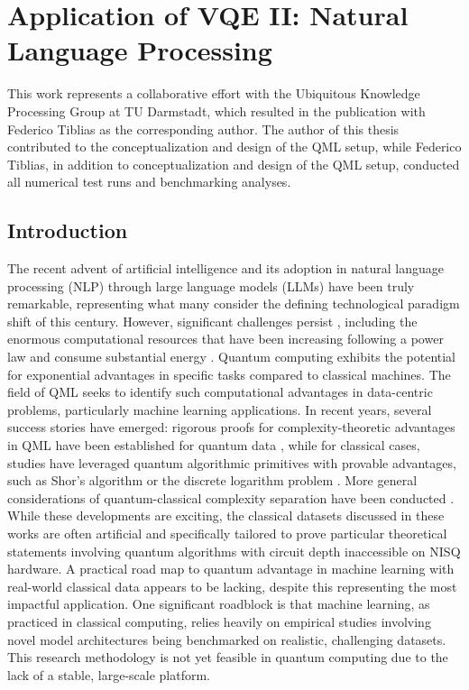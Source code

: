 \documentclass[../main.tex]{subfiles}
\begin{document}
\chapter{Application of VQE II: Natural Language Processing}\label{chap:qnlp}

This work represents a collaborative effort with the Ubiquitous Knowledge Processing Group at TU Darmstadt, which resulted in the publication \cite{tiblias2025an} with Federico Tiblias as the corresponding author. The author of this thesis contributed to the conceptualization and design of the QML setup, while Federico Tiblias, in addition to conceptualization and design of the QML setup, conducted all numerical test runs and benchmarking analyses.

\section{Introduction}

The recent advent of artificial intelligence \cite{krizhevsky2012imagenet} and its adoption in natural language processing (NLP) through large language models (LLMs) \cite{vaswani2017attention,brown2020language} have been truly remarkable, representing what many consider the defining technological paradigm shift of this century. However, significant challenges persist \cite{kaddour2023challenges}, including the enormous computational resources that have been increasing following a power law \cite{kaplan2020scaling} and consume substantial energy \cite{schwartz2019green}. Quantum computing exhibits the potential for exponential advantages in specific tasks compared to classical machines. The field of \ac{QML} \cite{biamonte2017quantum} seeks to identify such computational advantages in data-centric problems, particularly machine learning applications.
In recent years, several success stories have emerged: rigorous proofs for complexity-theoretic advantages in QML have been established for quantum data \cite{huang2021information, huang2022quantum}, while for classical cases, studies have leveraged quantum algorithmic primitives with provable advantages, such as Shor's algorithm or the discrete logarithm problem \cite{sweke2021on, pirnay2023superpolynomial, servedio2012equivalences, liu2021a}. More general considerations of quantum-classical complexity separation have been conducted \cite{yamasaki2023advantage, gyurik2023exponential, molteni2025quantum}.
While these developments are exciting, the classical datasets discussed in these works are often artificial and specifically tailored to prove particular theoretical statements involving quantum algorithms with circuit depth inaccessible on NISQ hardware. A practical road map to quantum advantage in machine learning with real-world classical data appears to be lacking, despite this representing the most impactful application. One significant roadblock is that machine learning, as practiced in classical computing, relies heavily on empirical studies involving novel model architectures being benchmarked on realistic, challenging datasets. This research methodology is not yet feasible in quantum computing due to the lack of a stable, large-scale platform.
\end{document}
